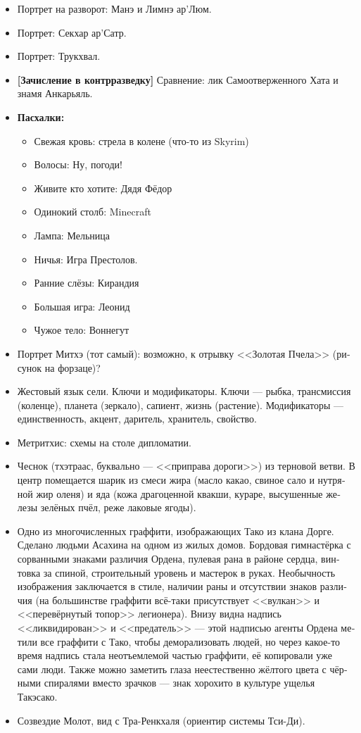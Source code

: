 \documentclass[a4paper,12pt,fleqn]{book}\usepackage{cooltooltips}\usepackage{polyglossia}\setdefaultlanguage[babelshorthands=true]{russian}\setotherlanguage{english}\defaultfontfeatures{Ligatures=TeX,Mapping=tex-text} \usepackage{xcolor}\definecolor{lightgray}{HTML}{bbbbbb}\color{lightgray}\newcommand{\ml}[3]{\textenglish{\textcolor{black}{#3}}}
\begin{document}
{\begin{itemize}
\item Портрет на разворот: Манэ и Лимнэ ар'Люм.
\item Портрет: Секхар ар'Сатр.
\item Портрет: Трукхвал.
\item \textbf{[Зачисление в контрразведку]} Сравнение: лик Самоотверженного Хата и знамя Анкарьяль.
\item \textbf{Пасхалки:}
\begin{itemize}
\item Свежая кровь: стрела в колене (что-то из Skyrim)
\item Волосы: Ну, погоди!
\item Живите кто хотите: Дядя Фёдор
\item Одинокий столб: Minecraft
\item Лампа: Мельница
\item Ничья: Игра Престолов.
\item Ранние слёзы: Кирандия
\item Большая игра: Леонид
\item Чужое тело: Воннегут
\end{itemize}
\item Портрет Митхэ (тот самый): возможно, к отрывку <<Золотая Пчела>> (рисунок на форзаце)?
\item Жестовый язык сели.
Ключи и модификаторы.
Ключи --- рыбка, трансмиссия (коленце), планета (зеркало), сапиент, жизнь (растение).
Модификаторы --- единственность, акцент, даритель, хранитель, свойство.
\item Метритхис: схемы на столе дипломатии.
\item Чеснок (тхэтраас, буквально --- <<приправа дороги>>) из терновой ветви. 
В центр помещается шарик из смеси жира (масло какао, свиное сало и нутряной жир оленя) и яда (кожа драгоценной квакши, кураре, высушенные железы зелёных пчёл, реже лаковые ягоды).
\item Одно из многочисленных граффити, изображающих Тако из клана Дорге.
Сделано людьми Асахина на одном из жилых домов.
Бордовая гимнастёрка с сорванными знаками различия Ордена, пулевая рана в районе сердца, винтовка за спиной, строительный уровень и мастерок в руках.
Необычность изображения заключается в стиле, наличии раны и отсутствии знаков различия (на большинстве граффити всё-таки присутствует <<вулкан>> и <<перевёрнутый топор>> легионера).
Внизу видна надпись <<ликвидирован>> и <<предатель>> --- этой надписью агенты Ордена метили все граффити с Тако, чтобы деморализовать людей, но через какое-то время надпись стала неотъемлемой частью граффити, её копировали уже сами люди.
Также можно заметить глаза неестественно жёлтого цвета с чёрными спиралями вместо зрачков --- знак хорохито в культуре ущелья Такэсако.
\item Созвездие Молот, вид с Тра-Ренкхаля (ориентир системы Тси-Ди).
\end{itemize}

}
\end{document}
